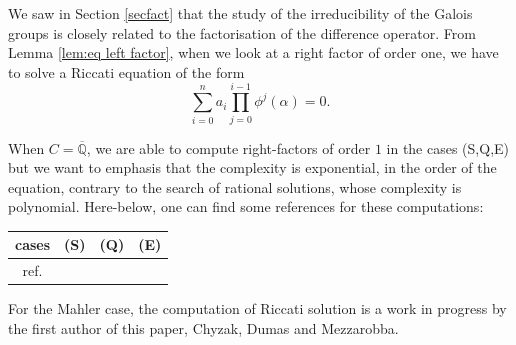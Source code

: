 \documentclass[a4paper,11pt]{amsart}
\def\Q{\mathbb{Q}}
\begin{document}
We saw in Section \ref{secfact} that the study of the irreducibility of the Galois groups is closely related to the factorisation of the difference operator.  From Lemma \ref{lem:eq left factor}, when we look at a right factor of order one, we have to solve a Riccati equation of the form  $$
\sum\limits_{i=0}^n a_i \prod\limits_{j=0}^{i-1} \phi^j(\alpha) = 0.
$$

When $C=\overline{\Q}$,  we are able to compute right-factors of order $1$ in the cases (S,Q,E) but we want to emphasis that the complexity is exponential, in the order of the equation, contrary to the search of rational solutions, whose complexity is polynomial. 
   Here-below, one can find some references for these computations:

\medskip
\begin{center}
\begin{tabular}{|c|c|c|c|}
\hline
    cases &  (S) & (Q) & (E)\\
\hline 
ref.  & \cite{Petkovsek92,CvH06,abramov2021rational} & \cite{APP98,CvH06,abramov2021rational} &\cite{dreyfus2015galois,combot2022hyperexponential} \\
\hline
\end{tabular}
\end{center}
\medskip 
For the Mahler case, the computation of Riccati solution is a work in progress by the first author of this paper, Chyzak, Dumas and Mezzarobba.
\medskip
\end{document}

